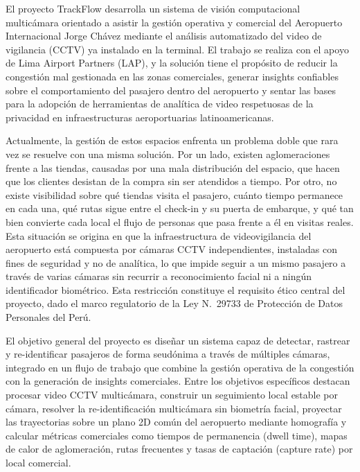 \documentclass[12pt,a4paper]{article}
\begin{document}
El proyecto TrackFlow desarrolla un sistema de visión computacional
multicámara orientado a asistir la gestión operativa y comercial del
Aeropuerto Internacional Jorge Chávez mediante el análisis automatizado
del video de vigilancia (CCTV) ya instalado en la terminal. El trabajo se
realiza con el apoyo de Lima Airport Partners (LAP), y la solución tiene
el propósito de reducir la congestión mal gestionada en las zonas
comerciales, generar insights confiables sobre el comportamiento del
pasajero dentro del aeropuerto y sentar las bases para la adopción de
herramientas de analítica de video respetuosas de la privacidad en
infraestructuras aeroportuarias latinoamericanas.

Actualmente, la gestión de estos espacios enfrenta un problema doble que
rara vez se resuelve con una misma solución. Por un lado, existen
aglomeraciones frente a las tiendas, causadas por una mala distribución
del espacio, que hacen que los clientes desistan de la compra sin ser
atendidos a tiempo. Por otro, no existe visibilidad sobre qué tiendas
visita el pasajero, cuánto tiempo permanece en cada una, qué rutas sigue
entre el check-in y su puerta de embarque, y qué tan bien convierte cada
local el flujo de personas que pasa frente a él en visitas reales. Esta
situación se origina en que la infraestructura de videovigilancia del
aeropuerto está compuesta por cámaras CCTV independientes,
instaladas con fines de seguridad y no de analítica, lo que impide seguir
a un mismo pasajero a través de varias cámaras sin recurrir a
reconocimiento facial ni a ningún identificador biométrico. Esta
restricción constituye el requisito ético central del proyecto, dado el
marco regulatorio de la Ley N.\textdegree~29733 de Protección de Datos
Personales del Perú.

El objetivo general del proyecto es diseñar un sistema capaz de detectar,
rastrear y re-identificar pasajeros de forma seudónima a través de
múltiples cámaras, integrado en un flujo de trabajo que combine la
gestión operativa de la congestión con la generación de insights
comerciales. Entre los objetivos específicos destacan procesar video CCTV
multicámara, construir un seguimiento local estable por cámara, resolver
la re-identificación multicámara sin biometría facial, proyectar las
trayectorias sobre un plano 2D común del aeropuerto mediante homografía y
calcular métricas comerciales como tiempos de permanencia (dwell time),
mapas de calor de aglomeración, rutas frecuentes y tasas de captación
(capture rate) por local comercial.
\end{document}
